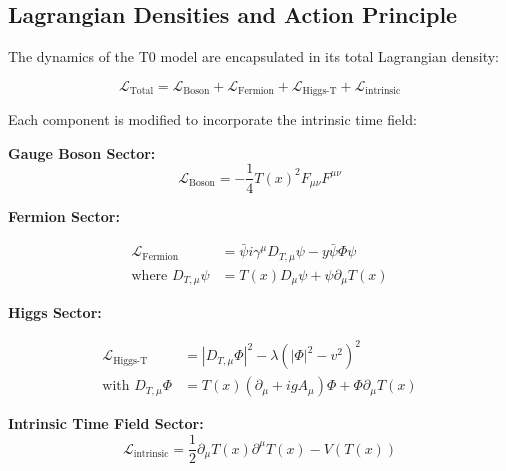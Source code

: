 \documentclass[12pt,a4paper]{article} %
\newcommand{\Tfield}{T(x)}
\newcommand{\DTmu}{D_{T,\mu}}
\newcommand{\calL}{\mathcal{L}}
\begin{document}
	\subsection{Lagrangian Densities and Action Principle}
	\label{subsec:lagrangian}
	
	The dynamics of the T0 model are encapsulated in its total Lagrangian density:
	\begin{tcolorbox}[width=\textwidth, colback=white, colframe=black, boxrule=0.5pt]
		\begin{equation}
			\calL_{\text{Total}} = \calL_{\text{Boson}}
			+ \calL_{\text{Fermion}}
			+ \calL_{\text{Higgs-T}}
			+ \calL_{\text{intrinsic}}
			\label{eq:total_lagrangian}
		\end{equation}
	\end{tcolorbox}
	
	Each component is modified to incorporate the intrinsic time field:
	
	\textbf{Gauge Boson Sector:}
	\begin{equation}
		\calL_{\text{Boson}} = -\frac{1}{4}\Tfield^2 F_{\mu\nu}F^{\mu\nu}
		\label{eq:boson_lagrangian}
	\end{equation}
	
	\textbf{Fermion Sector:}
	\begin{tcolorbox}[width=\textwidth, colback=white, colframe=black, boxrule=0.5pt]
		\begin{align}
			\calL_{\text{Fermion}} &= \bar{\psi}i\gamma^{\mu}\DTmu\psi
			- y\bar{\psi}\Phi\psi
			\label{eq:fermion_lagrangian_part1} \\
			\text{where } \DTmu\psi &= \Tfield D_{\mu}\psi
			+ \psi\partial_{\mu}\Tfield
			\label{eq:fermion_lagrangian_part2}
		\end{align}
	\end{tcolorbox}
	
	\textbf{Higgs Sector:}
	\begin{tcolorbox}[width=\textwidth, colback=white, colframe=black, boxrule=0.5pt]
		\begin{align}
			\calL_{\text{Higgs-T}} &= |D_{T,\mu}\Phi|^2
			- \lambda(|\Phi|^2 - v^2)^2
			\label{eq:higgs_lagrangian_part1} \\
			\text{with } D_{T,\mu}\Phi &= \Tfield(\partial_{\mu} + igA_{\mu})\Phi
			+ \Phi\partial_{\mu}\Tfield
			\label{eq:higgs_lagrangian_part2}
		\end{align}
	\end{tcolorbox}
	
	\textbf{Intrinsic Time Field Sector:}
	\begin{equation}
		\calL_{\text{intrinsic}} = \frac{1}{2}\partial_{\mu}\Tfield\partial^{\mu}\Tfield
		- V(\Tfield)
		\label{eq:intrinsic_lagrangian}
	\end{equation}
	
\end{document}
